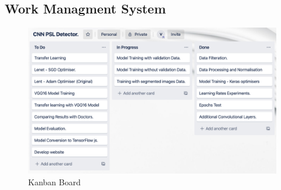 \pagebreak
\subsection{Work Managment System}
\begin{figure}[!htp]
    \centering
    \includegraphics[width=15cm]{Images/Kanban Bords.png}
    \caption{Kanban Board}
\end{figure}
\pagebreak



